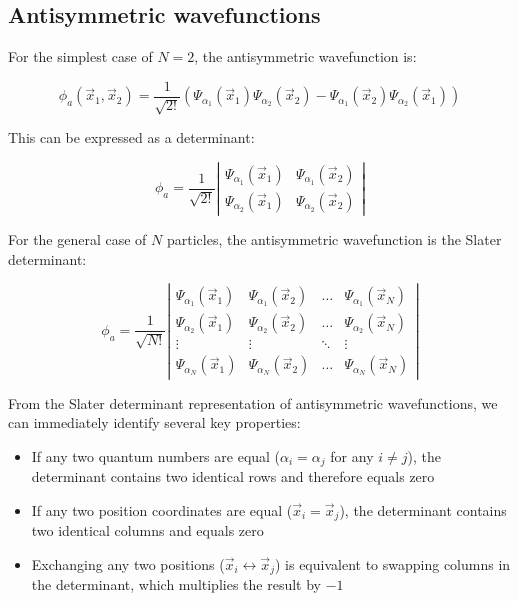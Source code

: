 \documentclass[italian]{HKNdocument}
\begin{document}
\subsection{Antisymmetric wavefunctions}
For the simplest case of $N=2$, the antisymmetric wavefunction is:

\begin{equation}
\phi_a(\vec{x}_1,\vec{x}_2)=\frac{1}{\sqrt{2!}}(\Psi_{\alpha_1}(\vec{x}_1)\Psi_{\alpha_2}(\vec{x}_2)-\Psi_{\alpha_1}(\vec{x}_2)\Psi_{\alpha_2}(\vec{x}_1)) \label{eq:14.25}
\end{equation}

This can be expressed as a determinant:

\[
\phi_a=\frac{1}{\sqrt{2!}}\left|\begin{array}{ll}
\Psi_{\alpha_1}(\vec{x}_1) & \Psi_{\alpha_1}(\vec{x}_2) \label{eq:14.26}\\
\Psi_{\alpha_2}(\vec{x}_1) & \Psi_{\alpha_2}(\vec{x}_2)
\end{array}\right|
\]

For the general case of $N$ particles, the antisymmetric wavefunction is the Slater determinant:

\[
\phi_a=\frac{1}{\sqrt{N!}}\left|\begin{array}{cccc}
\Psi_{\alpha_1}(\vec{x}_1) & \Psi_{\alpha_1}(\vec{x}_2) & \ldots & \Psi_{\alpha_1}(\vec{x}_N) \label{eq:14.27}\\
\Psi_{\alpha_2}(\vec{x}_1) & \Psi_{\alpha_2}(\vec{x}_2) & \ldots & \Psi_{\alpha_2}(\vec{x}_N)\\
\vdots & \vdots & \ddots & \vdots\\
\Psi_{\alpha_N}(\vec{x}_1) & \Psi_{\alpha_N}(\vec{x}_2) & \ldots & \Psi_{\alpha_N}(\vec{x}_N)
\end{array}\right|
\]


From the Slater determinant representation of antisymmetric wavefunctions, we can immediately identify several key properties:

\begin{itemize}
  \item If any two quantum numbers are equal ($\alpha_i=\alpha_j$ for any $i\neq j$), the determinant contains two identical rows and therefore equals zero
  \item If any two position coordinates are equal ($\vec{x}_i=\vec{x}_j$), the determinant contains two identical columns and equals zero
  \item Exchanging any two positions ($\vec{x}_i \leftrightarrow \vec{x}_j$) is equivalent to swapping columns in the determinant, which multiplies the result by $-1$
\end{itemize}
\end{document}
